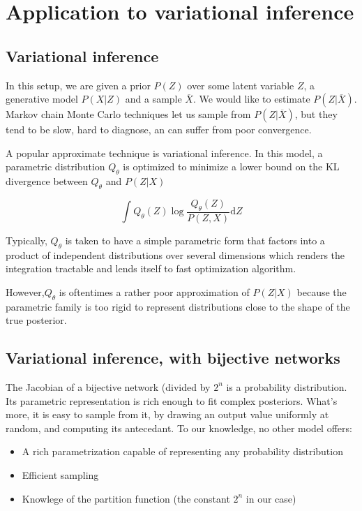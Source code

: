 \documentclass{article}
\begin{document}
\section{Application to variational inference}

\subsection{Variational inference}

In this setup, we are given a prior \(P(Z)\) over some latent variable \(Z\),
a generative model \(P(X | Z)\) and a sample \(\overline{X}\). We would like to
estimate \(P(Z | \overline{X})\). Markov chain Monte Carlo techniques let us
sample from \(P(Z | \overline{X})\), but they tend to be slow,
hard to diagnose, an can suffer from poor convergence.

A popular approximate technique is variational inference. In this model, a
parametric distribution \(Q_{\theta}\) is optimized to minimize a lower bound
on the KL divergence between \(Q_{\theta}\) and \(P(Z | X)\)

\[
  \int Q_{\theta}(Z) \log \frac{Q_{\theta}(Z)}{P(Z, X)} \mathrm{d}Z
\]

Typically, \(Q_{\theta}\) is taken to have a simple parametric form that factors
into a product of independent distributions over several dimensions which
renders the integration tractable and lends itself to  fast optimization
algorithm.

However,\(Q_{\theta}\) is oftentimes a rather poor approximation of
\(P(Z | X)\) because the parametric family is too rigid to represent
distributions close to the shape of the true posterior.

\subsection{Variational inference, with bijective networks}

The Jacobian of a bijective network (divided by \(2^n\)
is a probability distribution. Its parametric representation is rich
enough to fit complex posteriors. What's more, it is easy to sample from it,
by drawing an output value uniformly at random, and computing its antecedant.
To our knowledge, no other model offers:

\begin{itemize}
\item A rich parametrization capable of representing any probability
  distribution
\item Efficient sampling
\item Knowlege of the partition function (the constant \(2^n\) in our case)
\end{itemize}
\end{document}
